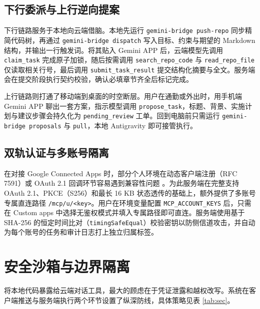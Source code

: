 \documentclass[10pt,a4paper,twocolumn]{article}
\begin{document}
\subsection{下行委派与上行逆向提案}

下行链路服务于本地向云端借脑。本地先运行 \texttt{gemini-bridge push-repo} 同步精简代码树，再通过 \texttt{gemini-bridge dispatch} 写入目标、约束与期望的 Markdown 结构，并输出一行触发词。将其贴入 Gemini APP 后，云端模型先调用 \texttt{claim\_task} 完成原子加锁，随后按需调用 \texttt{search\_repo\_code} 与 \texttt{read\_repo\_file} 仅读取相关行号，最后调用 \texttt{submit\_task\_result} 提交结构化摘要与全文。服务端会在提交阶段执行契约校验，确认必填章节齐全后标记完成。

上行链路则打通了移动端到桌面的时空断层。用户在通勤或外出时，用手机端 Gemini APP 聊出一套方案，指示模型调用 \texttt{propose\_task}，标题、背景、实施计划与建议步骤会持久化为 \texttt{pending\_review} 工单。回到电脑前只需运行 \texttt{gemini-bridge proposals} 与 \texttt{pull}，本地 Antigravity 即可接管执行。

\subsection{双轨认证与多账号隔离}

在对接 Google Connected Apps 时，部分个人环境在动态客户端注册（RFC 7591）或 OAuth 2.1 回调环节容易遇到兼容性问题 \cite{rfc7591}。为此服务端在完整支持 OAuth 2.1、PKCE（S256）和最长 16 KB 状态透传的基础上，额外提供了多账号专属直连路径 \texttt{/mcp/u/<key>}。用户在环境变量配置 \texttt{MCP\_ACCOUNT\_KEYS} 后，只需在 Custom apps 中选择无鉴权模式并填入专属路径即可直连。服务端使用基于 SHA-256 的恒定时间比对（\texttt{timingSafeEqual}）校验密钥以防侧信道攻击，并自动为每个账号的任务和审计日志打上独立归属标签。

\section{安全沙箱与边界隔离}

将本地代码暴露给云端对话工具，最大的顾虑在于凭证泄露和越权改写。系统在客户端推送与服务端执行两个环节设置了纵深防线，具体策略见表 \ref{tab:sec}。
\end{document}
